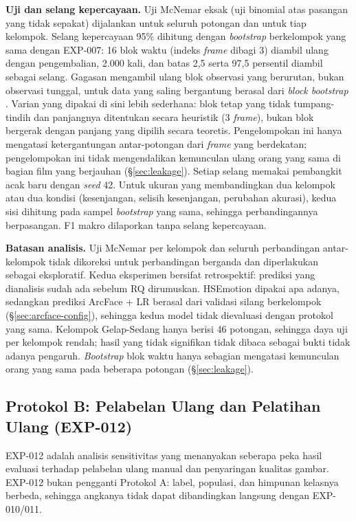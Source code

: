\textbf{Uji dan selang kepercayaan.} Uji McNemar eksak (uji binomial atas pasangan yang tidak sepakat) dijalankan untuk seluruh potongan dan untuk tiap kelompok. Selang kepercayaan 95\% dihitung dengan \textit{bootstrap} berkelompok yang sama dengan EXP-007: 16 blok waktu (indeks \textit{frame} dibagi 3) diambil ulang dengan pengembalian, 2.000 kali, dan batas 2,5 serta 97,5 persentil diambil sebagai selang. Gagasan mengambil ulang blok observasi yang berurutan, bukan observasi tunggal, untuk data yang saling bergantung berasal dari \textit{block bootstrap} \citep{kunsch1989jackknife}. Varian yang dipakai di sini lebih sederhana: blok tetap yang tidak tumpang-tindih dan panjangnya ditentukan secara heuristik (3 \textit{frame}), bukan blok bergerak dengan panjang yang dipilih secara teoretis. Pengelompokan ini hanya mengatasi ketergantungan antar-potongan dari \textit{frame} yang berdekatan; pengelompokan ini tidak mengendalikan kemunculan ulang orang yang sama di bagian film yang berjauhan (\S\ref{sec:leakage}). Setiap selang memakai pembangkit acak baru dengan \textit{seed} 42. Untuk ukuran yang membandingkan dua kelompok atau dua kondisi (kesenjangan, selisih kesenjangan, perubahan akurasi), kedua sisi dihitung pada sampel \textit{bootstrap} yang sama, sehingga perbandingannya berpasangan. F1 makro dilaporkan tanpa selang kepercayaan.

\textbf{Batasan analisis.} Uji McNemar per kelompok dan seluruh perbandingan antar-kelompok tidak dikoreksi untuk perbandingan berganda dan diperlakukan sebagai eksploratif. Kedua eksperimen bersifat retrospektif: prediksi yang dianalisis sudah ada sebelum RQ dirumuskan. HSEmotion dipakai apa adanya, sedangkan prediksi ArcFace + LR berasal dari validasi silang berkelompok (\S\ref{sec:arcface-config}), sehingga kedua model tidak dievaluasi dengan protokol yang sama. Kelompok Gelap-Sedang hanya berisi 46 potongan, sehingga daya uji per kelompok rendah; hasil yang tidak signifikan tidak dibaca sebagai bukti tidak adanya pengaruh. \textit{Bootstrap} blok waktu hanya sebagian mengatasi kemunculan orang yang sama pada beberapa potongan (\S\ref{sec:leakage}).

\subsection{Protokol B: Pelabelan Ulang dan Pelatihan Ulang (EXP-012)}
\label{sec:protocol-b}

EXP-012 adalah analisis sensitivitas yang menanyakan seberapa peka hasil evaluasi terhadap pelabelan ulang manual dan penyaringan kualitas gambar. EXP-012 bukan pengganti Protokol A: label, populasi, dan himpunan kelasnya berbeda, sehingga angkanya tidak dapat dibandingkan langsung dengan EXP-010/011.

